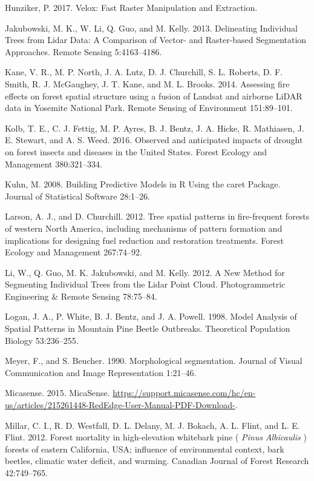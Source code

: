\documentclass[]{article}
\begin{document}
\hypertarget{ref-hunziker2017}{}
Hunziker, P. 2017. Velox: Fast Raster Manipulation and Extraction.

\hypertarget{ref-jakubowski2013}{}
Jakubowski, M. K., W. Li, Q. Guo, and M. Kelly. 2013. Delineating
Individual Trees from Lidar Data: A Comparison of Vector- and
Raster-based Segmentation Approaches. Remote Sensing 5:4163--4186.

\hypertarget{ref-kane2014}{}
Kane, V. R., M. P. North, J. A. Lutz, D. J. Churchill, S. L. Roberts, D.
F. Smith, R. J. McGaughey, J. T. Kane, and M. L. Brooks. 2014. Assessing
fire effects on forest spatial structure using a fusion of Landsat and
airborne LiDAR data in Yosemite National Park. Remote Sensing of
Environment 151:89--101.

\hypertarget{ref-kolb2016}{}
Kolb, T. E., C. J. Fettig, M. P. Ayres, B. J. Bentz, J. A. Hicke, R.
Mathiasen, J. E. Stewart, and A. S. Weed. 2016. Observed and anticipated
impacts of drought on forest insects and diseases in the United States.
Forest Ecology and Management 380:321--334.

\hypertarget{ref-kuhn2008}{}
Kuhn, M. 2008. Building Predictive Models in R Using the caret Package.
Journal of Statistical Software 28:1--26.

\hypertarget{ref-larson2012}{}
Larson, A. J., and D. Churchill. 2012. Tree spatial patterns in
fire-frequent forests of western North America, including mechanisms of
pattern formation and implications for designing fuel reduction and
restoration treatments. Forest Ecology and Management 267:74--92.

\hypertarget{ref-li2012}{}
Li, W., Q. Guo, M. K. Jakubowski, and M. Kelly. 2012. A New Method for
Segmenting Individual Trees from the Lidar Point Cloud. Photogrammetric
Engineering \& Remote Sensing 78:75--84.

\hypertarget{ref-logan1998}{}
Logan, J. A., P. White, B. J. Bentz, and J. A. Powell. 1998. Model
Analysis of Spatial Patterns in Mountain Pine Beetle Outbreaks.
Theoretical Population Biology 53:236--255.

\hypertarget{ref-meyer1990}{}
Meyer, F., and S. Beucher. 1990. Morphological segmentation. Journal of
Visual Communication and Image Representation 1:21--46.

\hypertarget{ref-micasense2015}{}
Micasense. 2015. MicaSense.
\url{https://support.micasense.com/hc/en-us/articles/215261448-RedEdge-User-Manual-PDF-Download-}.

\hypertarget{ref-millar2012}{}
Millar, C. I., R. D. Westfall, D. L. Delany, M. J. Bokach, A. L. Flint,
and L. E. Flint. 2012. Forest mortality in high-elevation whitebark pine
( \emph{Pinus} \emph{Albicaulis} ) forests of eastern California, USA;
influence of environmental context, bark beetles, climatic water
deficit, and warming. Canadian Journal of Forest Research 42:749--765.
\end{document}
